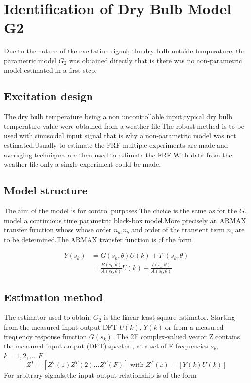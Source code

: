 \documentclass[a4paper,12pt]{report}
\numberwithin{equation}{section}
\begin{document}
\section{Identification of Dry Bulb Model G2 }
Due to the nature of the excitation signal; the dry bulb outside temperature, the parametric model $G_{2}$ was obtained directly that is there was no non-parametric model estimated in a first step.

\subsection{Excitation design}
The dry bulb temperature being a non uncontrollable input,typical dry bulb temperature value were obtained from a weather file.The robust method is to be used with sinusoidal input signal that is why a non-parametric model was not estimated.Usually to estimate the FRF multiple experiments are made and averaging techniques are then used to estimate the FRF.With data from the weather file only a single experiment could be made.

\subsection{Model structure}
The aim of the model is for control purposes.The choice is the same as for the $G_{1}$ model a continuous time parametric black-box model.More precisely an ARMAX transfer function whose whose order $n_{a}$,$n_{b}$ and order of the transient term $n_{i}$ are to be determined.The ARMAX transfer function  is of the form

\begin{equation}
\begin{aligned}
Y(s_{k}) &=G(s_{k}, \theta) U(k)+T^{\circ}(s_{k}, \theta) \\
&=\frac{B(s_{k}, \theta)}{A(s_{k}, \theta)} U(k)+\frac{I(s_{k}, \theta)}{A(s_{k}, \theta)}
\end{aligned}
\end{equation}

\subsection{Estimation method}
The estimator used to obtain $G_{2}$ is the linear least square estimator. Starting from the measured input-output DFT $U(k)$, $Y(k)$ or from a measured frequency response function $G(s_{k})$. The 2F complex-valued vector Z contains the measured
input-output (DFT) spectra , at a set of F frequencies $s_{k}$, $k = 1, 2, ...,F$
 $$
Z^{T}=\left[Z^{T}(1) Z^{T}(2) \ldots Z^{T}(F)\right] \text { with } Z^{T}(k)=[Y(k) U(k)]
$$
\noindent
 For arbitrary signals,the input-output relationship is of the form
\end{document}
